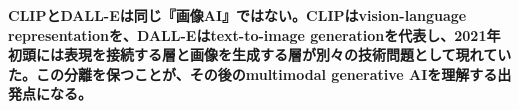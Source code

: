 \noindent\textbf{CLIPとDALL-Eは同じ『画像AI』ではない。CLIPはvision-language representationを、DALL-Eはtext-to-image generationを代表し、2021年初頭には表現を接続する層と画像を生成する層が別々の技術問題として現れていた。この分離を保つことが、その後のmultimodal generative AIを理解する出発点になる。}\autocite{src-005ad180fc46,src-009747d6fa68,src-bc37d5969edc,src-f14c51ae873c}
